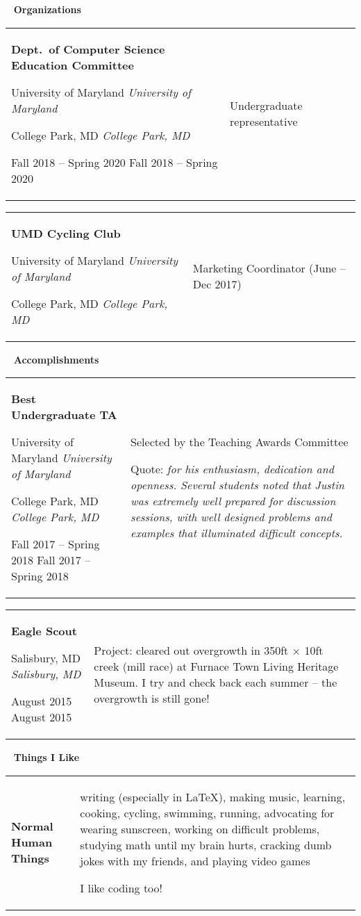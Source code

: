\documentclass[11pt,letterpaper]{article}
\newcommand{\sect}[1]{
\begin{center}
	\noindent\xrfill[0.7ex]{0.5pt} \mbox{ } {\Large \bf #1} \mbox{ } \xrfill[0.7ex]{0.5pt}
\end{center}
}
\newcommand{\entry}[5]{
	\noindent
	\begin{tabular}{p{2in} p{\dimexpr \linewidth-2\tabcolsep-2.25in}} %
		\noindent \textbf{#1}
		
		\ifx #2  \else \noindent \textit{#2} \fi
		
		\ifx #3  \else \noindent \textit{#3} \fi
		
		\ifx #4  \else \noindent #4 \fi
		&
		#5
	\end{tabular}
	\vspace{0.5cm}
}
\begin{document}
	\pagebreak
	\sect{Organizations}
	
	\entry{Dept.\ of Computer Science Education Committee}{University of Maryland}{College Park, MD}{Fall 2018 -- Spring 2020}{
		Undergraduate representative
	}
	
	\entry{UMD Cycling Club}{University of Maryland}{College Park, MD}{}{
		Marketing Coordinator (June -- Dec 2017)
	}
	
	\sect{Accomplishments}
	
	\entry{Best Undergraduate TA}{University of Maryland}{College Park, MD}{Fall 2017 -- Spring 2018}{
		Selected by the Teaching Awards Committee
		
		Quote: \textit{for his enthusiasm, dedication and openness. Several students noted that Justin was extremely well prepared for discussion sessions, with well designed problems and examples that illuminated difficult concepts.}
	}
	
	\entry{Eagle Scout}{}{Salisbury, MD}{August 2015}{
		Project: cleared out overgrowth in 350ft \(\times\) 10ft creek (mill race) at Furnace Town Living Heritage Museum. I try and check back each summer -- the overgrowth is still gone!
	}
	
	\sect{Things I Like}
	
	\entry{Normal Human Things}{}{}{}{
		writing (especially in \LaTeX), making music, learning, cooking, cycling, swimming, running, advocating for wearing sunscreen, working on difficult problems, studying math until my brain hurts, cracking dumb jokes with my friends, and playing video games
		
		I like coding too!
	}
\end{document}
